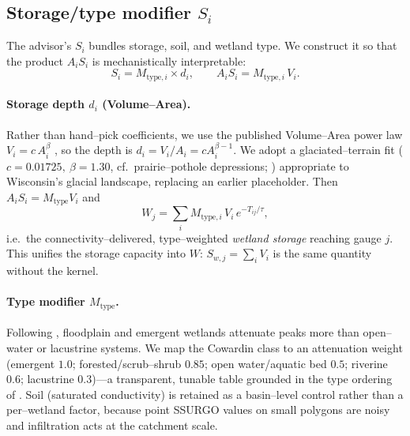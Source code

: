 \documentclass[11pt]{article}
\newcommand{\Wj}{W_{j}}
\newcommand{\Sw}{S_{w,j}}
\newcommand{\Ti}{T_{ij}}
\begin{document}
\subsection{Storage/type modifier $S_i$}
The advisor's $S_i$ bundles storage, soil, and wetland type. We construct it so that the product
$A_i S_i$ is mechanistically interpretable:
\begin{equation}
S_i = M_{\text{type},i}\times d_i,\qquad A_i S_i = M_{\text{type},i}\,V_i .
\end{equation}
\paragraph{Storage depth $d_i$ (Volume--Area).} Rather than hand--pick coefficients, we use the
published Volume--Area power law $V_i = c\,A_i^{\beta}$
\citep{gleason2007,laneDamico2010,wu2016}, so the depth is $d_i=V_i/A_i=c A_i^{\beta-1}$. We adopt
a glaciated--terrain fit ($c\!=\!0.01725,\ \beta\!=\!1.30$, cf.\ prairie--pothole depressions;
\citealp{wu2016}) appropriate to Wisconsin's glacial landscape, replacing an earlier placeholder.
Then $A_i S_i = M_{\text{type}}V_i$ and
\begin{equation}
\Wj=\sum_i M_{\text{type},i}\,V_i\,e^{-\Ti/\tau},
\label{eq:Wfinal}
\end{equation}
i.e.\ the connectivity--delivered, type--weighted \emph{wetland storage} reaching gauge $j$. This
unifies the storage capacity into $W$: $\Sw=\sum_i V_i$ is the same quantity without the kernel.
\paragraph{Type modifier $M_{\text{type}}$.} Following \citet{acreman2013}, floodplain and emergent
wetlands attenuate peaks more than open--water or lacustrine systems. We map the Cowardin class to
an attenuation weight (emergent $1.0$; forested/scrub--shrub $0.85$; open water/aquatic bed $0.5$;
riverine $0.6$; lacustrine $0.3$)---a transparent, tunable table grounded in the type ordering of
\citet{acreman2013,bullock2003}. Soil (saturated conductivity) is retained as a basin--level
control rather than a per--wetland factor, because point SSURGO values on small polygons are noisy
and infiltration acts at the catchment scale.
\end{document}

